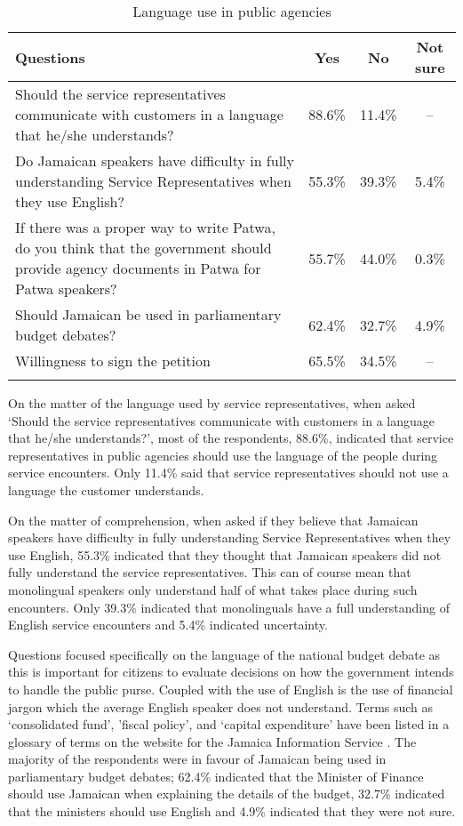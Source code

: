 \documentclass[output=paper,colorlinks,citecolor=brown]{langscibook}
\begin{document}
\begin{table}	
\caption{Language use in public agencies\label{tab:02:4}}
\begin{tabularx}{\textwidth}{Qccc}
    \lsptoprule
    Questions & Yes & No & Not sure\\\midrule
    Should the service representatives communicate with customers in a language that he/she understands? & 88.6\% & 11.4\% & -- \\
    \tablevspace
    Do Jamaican speakers have difficulty in fully understanding Service Representatives when they use English? & 55.3\% & 39.3\% & 5.4\%\\
    \tablevspace
    If there was a proper way to write Patwa, do you think that the government should provide agency documents in Patwa for Patwa speakers? & 55.7\% & 44.0\% & 0.3\%\\
    \tablevspace
    Should Jamaican be used in parliamentary budget debates? & 62.4\% & 32.7\% & 4.9\%\\
    \tablevspace
    Willingness to sign the petition & 65.5\% & 34.5\% & --\\
    \lspbottomrule
\end{tabularx}
\end{table}

On the matter of the language used by service representatives, when asked ‘Should the service representatives communicate with customers in a language that he/she understands?’, most of the respondents, 88.6\%, indicated that service representatives in public agencies should use the language of the people during service encounters. Only 11.4\% said that service representatives should not use a language the customer understands. 
                
On the matter of comprehension, when asked if they believe that Jamaican speakers have difficulty in fully understanding Service Representatives when they use English, 55.3\% indicated that they thought that Jamaican speakers did not fully understand the service representatives. This can of course mean that monolingual speakers only understand half of what takes place during such encounters. Only 39.3\% indicated that monolinguals have a full understanding of English service encounters and 5.4\% indicated uncertainty. 

Questions focused specifically on the language of the national budget debate as this is important for citizens to evaluate decisions on how the government intends to handle the public purse. Coupled with the use of English is the use of financial jargon which the average English speaker does not understand. Terms such as ‘consolidated fund', 'fiscal policy’, and ‘capital expenditure' have been listed in a glossary of terms on the website for the Jamaica Information Service \citep{JIS2020}. The majority of the respondents were in favour of Jamaican being used in parliamentary budget debates; 62.4\% indicated that the Minister of Finance should use Jamaican when explaining the details of the budget, 32.7\% indicated that the ministers should use English and 4.9\% indicated that they were not sure. 
\end{document}
